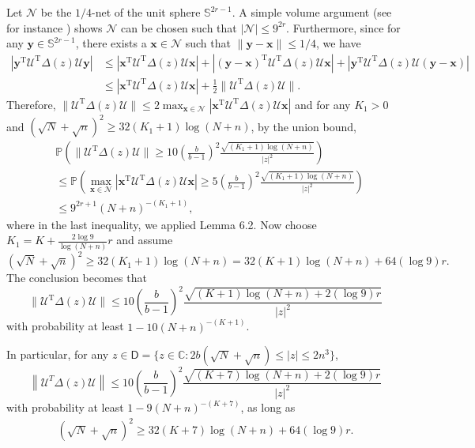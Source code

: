 \documentclass[reqno]{amsart}
\newcommand{\Prob}{\mathbb{P}}
\newcommand{\T}{\mathrm{T}}
\theoremstyle{plain}
\theoremstyle{definition}
\begin{document}
 Let $\mathcal N$ be the ${1}/{4}$-net of the unit sphere $\mathbb{S}^{2r-1}$. A simple volume argument (see for instance \cite[Corollary 4.2.13]{Vbook}) shows $\mathcal{N}$ can be chosen such that $|\mathcal N| \le 9^{2r}$. Furthermore, since for any $\mathbf y \in \mathbb{S}^{2r-1}$, there exists a $\mathbf x \in \mathcal N$ such that $\|\mathbf y- \mathbf x\|\le 1/4$, we have
\begin{align*}
\left|\mathbf y^\T \mathcal U^\T \Delta(z) \mathcal U \mathbf y \right| &\le \left|\mathbf x^\T \mathcal U^\T \Delta(z) \mathcal U \mathbf x \right| + \left|(\mathbf y-\mathbf x)^\T \mathcal U^\T \Delta(z) \mathcal U \mathbf x \right| + \left|\mathbf y^\T \mathcal U^\T \Delta(z) \mathcal U (\mathbf y -\mathbf x)\right|\\
&\le \left|\mathbf x^\T \mathcal U^\T \Delta(z) \mathcal U \mathbf x \right| + \frac{1}{2} \| \mathcal U^\T \Delta(z) \mathcal U \|.
\end{align*}
Therefore, 
$\| \mathcal U^\T \Delta(z) \mathcal U \| \le 2 \max_{\mathbf x \in \mathcal N} \left|\mathbf x^\T \mathcal U^\T \Delta(z) \mathcal U \mathbf x \right|$
and for any $K_1>0$ and $(\sqrt N + \sqrt n)^2 \ge 32 (K_1+1)\log(N+n)$,  by the union bound,
\begin{align*}
&\Prob\left(\| \mathcal U^\T \Delta(z) \mathcal U \| \ge 10\left(\frac{b}{b-1} \right)^2 \frac{  \sqrt{(K_1+1)\log (N+n)}}{ |z|^2} \right)\\
 &\le  \Prob \left(\max_{\mathbf x \in \mathcal N} \left|\mathbf x^\T \mathcal U^\T \Delta(z) \mathcal U \mathbf x \right| \ge 5\left(\frac{b}{b-1} \right)^2 \frac{  \sqrt{(K_1+1)\log (N+n)}}{ |z|^2} \right)\\
&\le  9^{2r+1} (N+n)^{-(K_1+1)},
\end{align*}
where in the last inequality, we applied Lemma 6.2. Now choose $K_1=K +\frac{2\log 9}{\log(N+n)} r$ and assume $$(\sqrt N + \sqrt n)^2 \ge 32 (K_1+1)\log(N+n)=32(K+1)\log(N+n) + 64(\log 9) r.$$ The conclusion becomes that 
$$\| \mathcal U^\T \Delta(z) \mathcal U \| \le 10\left(\frac{b}{b-1} \right)^2 \frac{\sqrt{(K+1)\log (N+n)+2(\log 9) r}}{|z|^2} $$
with probability at least $1-10(N+n)^{-(K+1)}$.

In particular, for any $z\in \mathsf D= \{ z\in \mathbb C : 2b(\sqrt N + \sqrt n)\le |z| \le 2n^3\}$,
\[ \left\| \mathcal U^T \Delta(z) \mathcal U  \right\| \leq 10\left(\frac{b}{b-1} \right)^2 \frac{\sqrt{(K+7)\log (N+n)+2(\log 9) r}}{|z|^2}  \] 
with probability at least $1 - 9(N+n)^{-(K+7)}$, as long as
\begin{align}\label{eq:dimension}
(\sqrt N + \sqrt n)^2 \ge 32(K+7)\log(N+n) + 64(\log 9) r.
\end{align}
\end{document}
